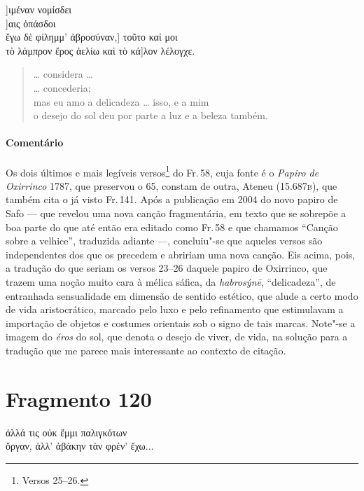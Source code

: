 \begin{gkverse}
]ιμέναν νομίσδει\\
    ]αις ὀπάσδοι\\
ἔγω δὲ φίλημμ’ ἀβροσύναν,\qquad       ] τοῦτο καί μοι\\
τὸ λάμπρον ἔρος ἀελίω καὶ τὸ κά]λον λέλογχε.
\end{gkverse}

\begin{verse}
\ldots{} considera \ldots{}\\
\ldots{} concederia;\\
mas eu amo a delicadeza \ldots{} isso, e a mim\\
o desejo do sol deu por parte a luz e a beleza também.
\end{verse}

\medskip

{\paragraph{Comentário} Os dois últimos e mais legíveis versos\footnote{Versos 25--26.} do Fr.\,58, cuja fonte é o
\emph{Papiro de Oxirrinco} 1787, que preservou o 65, constam de outra, Ateneu (15.687\textsc{b}), que também cita o já visto Fr.\,141. Após a publicação em 2004 do
novo papiro de Safo --- que revelou uma nova canção fragmentária, em texto que se
sobrepõe a boa parte do que até então era editado como Fr.\,58 e que chamamos ``Canção sobre a velhice'', traduzida adiante ---, concluiu"-se que aqueles
versos são independentes dos que os precedem e abririam uma nova canção. Eis acima, pois, a tradução do que seriam os versos 23--26 daquele papiro de Oxirrinco, que
trazem uma noção muito cara à mélica sáfica, da \emph{habrosýnē}, ``delicadeza'', de entranhada sensualidade em dimensão de sentido
estético, que alude a certo modo de vida aristocrático, marcado pelo luxo e pelo
refinamento que estimulavam a importação de objetos e costumes orientais
sob o signo de tais marcas. Note"-se a imagem do \emph{éros} do sol, que denota o desejo de viver, de vida, na solução para a tradução que me parece mais interessante ao contexto de citação.}

\section{Fragmento 120}

\begin{gkverse}
ἀλλά τις οὐκ ἔμμι παλιγκότων\\
ὄργαν, ἀλλ’ ἀβάκην τὰν φρέν’ ἔχω...
\end{gkverse}

